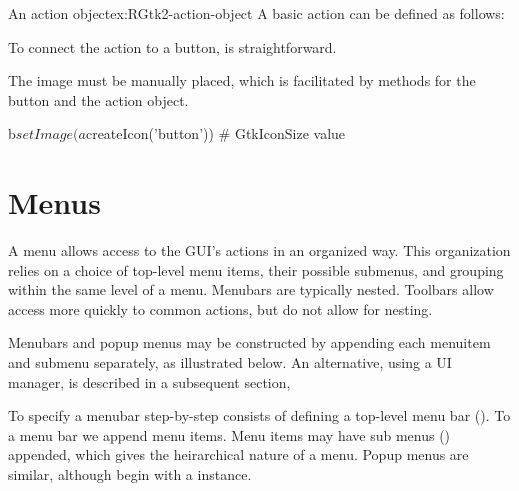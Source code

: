 \begin{example}{An action object}{ex:RGtk2-action-object}
A basic action can be defined as follows:
\begin{Schunk}
\end{Schunk}
To connect the action to a button, is straightforward.
\begin{Schunk}
\end{Schunk}

The image must be manually placed, which is facilitated by methods for
the button and the action object.
\begin{Schunk}
\begin{Sinput}
 b$setImage(a$createIcon('button')) # GtkIconSize value
\end{Sinput}
\end{Schunk}

\end{example}
\section{Menus}
\label{sec:RGtk2:menus}

A menu allows access to the GUI's actions in an organized way. This
organization relies on a choice of top-level menu items, their
possible submenus, and grouping within the same level of a
menu. Menubars are typically nested. Toolbars allow access more
quickly to common actions, but do not allow for nesting.

Menubars and popup menus  may be constructed by appending each menuitem
and submenu separately, as illustrated below. An alternative, using a
UI manager, is described in a subsequent section,

To specify a menubar step-by-step consists of defining a top-level
menu bar (). To a menu bar we append menu
items. Menu items may have sub menus () appended, which gives
the heirarchical nature of a menu. Popup menus are similar, although begin with a  instance.  

